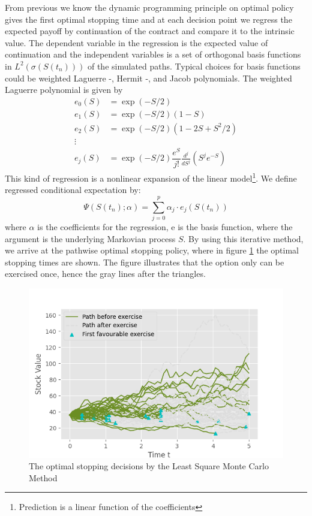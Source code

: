 From previous we know the dynamic programming principle on optimal policy gives the first optimal stopping time and at each decision point we regress the expected payoff by continuation of the contract and compare it to the intrinsic value. The dependent variable in the regression is the expected value of continuation and the independent variables is a set of orthogonal basis functions in $L^2(\sigma(S(t_n)))$ of the simulated paths. Typical choices for basis functions could be weighted Laguerre -, Hermit -, and Jacob polynomials. The weighted Laguerre polynomial is given by
\begin{align*}
e_0(S) &= \exp(-S/2) \\
e_1(S) &= \exp(-S/2) (1-S) \\
e_2(S) &= \exp(-S/2) (1-2S+S^2/2) \\
\vdots \\
e_j(S) &= \exp(-S/2) \dfrac{e^S}{j!} \frac{d^j}{dS^j}(S^j e^{-S}) 
\end{align*} 
This kind of regression is a nonlinear expansion of the linear model\footnote{Prediction is a linear function of the coefficients}. We define regressed conditional expectation by:
$$\Psi(S(t_n); \alpha)= \sum_{j=0}^p \alpha_j \cdot e_j(S(t_n)) $$
where $\alpha$ is the coefficients for the regression, e is the basis function, where the argument is the underlying Markovian process $S$. By using this iterative method, we arrive at the pathwise optimal stopping policy, where in figure \ref{fig:LSM2} the optimal stopping times are shown. The figure illustrates that the option only can be exercised once, hence the gray lines after the triangles.\\

\begin{figure}[th]
\centering
\includegraphics{Figures/LSMFit2.png}
\decoRule
\caption[Optimal Stopping Decision]{The optimal stopping decisions by the Least Square Monte Carlo Method}
\label{fig:LSM2}
\end{figure}

